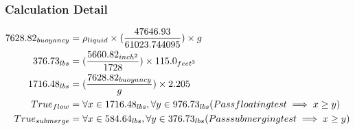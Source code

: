 \documentclass{article}%
\begin{document}
%
\subsubsection{Calculation Detail}%
\label{ssubsec:CalculationDetail}%
\begin{align}%
7628.82_{buoyancy} &=\rho_{liquid}\times (\frac{47646.93}{61023.744095}) \times g\notag\\%
376.73_{lbs} &=(\frac{5660.82_{inch^2}}{1728})\times 115.0_{feet^3}\notag\\%
1716.48_{lbs} &=(\frac{7628.82_{buoyancy}}{g})\times 2.205\notag\\%
True_{flow} &= \forall x\in 1716.48_{lbs}, \forall y\in 976.73_{lbs} (Pass floating test \implies x \geq y)\notag\\%
True_{submerge} &= \forall x\in 584.64_{lbs}, \forall y\in 376.73_{lbs} (Pass submerging test \implies x \geq y)\notag%
\end{align}

%
\end{document}
